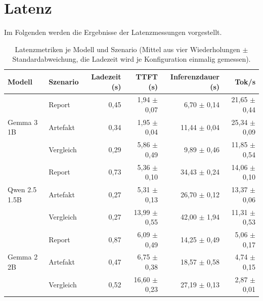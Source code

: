 \section{Latenz}
\label{sec:eval-latenz}
Im Folgenden werden die Ergebnisse der Latenzmessungen vorgestellt.
\setlength{\tabcolsep}{4pt}
\begin{table}[H]
    \centering
    \caption{Latenzmetriken je Modell und Szenario (Mittel aus vier Wiederholungen $\pm$ Standardabweichung, die Ladezeit wird je Konfiguration einmalig gemessen).}
    \label{tab:eval-latenz}
    \begin{tabular}{llrrrr}
        \toprule
        \textbf{Modell} & \textbf{Szenario} & \textbf{Ladezeit (s)} & \textbf{TTFT (s)} & \textbf{Inferenzdauer (s)} & \textbf{Tok/s} \\
        \midrule
        \multirow{3}{*}{Gemma 3 1B}
            & Report    & 0,45 & 1,94 $\pm$ 0,07 & 6,70 $\pm$ 0,14  & 21,65 $\pm$ 0,44 \\
            & Artefakt  & 0,34 & 1,95 $\pm$ 0,04 & 11,44 $\pm$ 0,04 & 25,34 $\pm$ 0,09 \\
            & Vergleich & 0,29 & 5,86 $\pm$ 0,49 & 9,89 $\pm$ 0,46  & 11,85 $\pm$ 0,54 \\
        \midrule
        \multirow{3}{*}{Qwen 2.5 1.5B}
            & Report    & 0,73 & 5,36 $\pm$ 0,10 & 34,43 $\pm$ 0,24 & 14,06 $\pm$ 0,10 \\
            & Artefakt  & 0,27 & 5,31 $\pm$ 0,13 & 26,70 $\pm$ 0,12 & 13,37 $\pm$ 0,06 \\
            & Vergleich & 0,27 & 13,99 $\pm$ 0,55 & 42,00 $\pm$ 1,94 & 11,31 $\pm$ 0,53 \\
        \midrule
        \multirow{3}{*}{Gemma 2 2B}
            & Report    & 0,87 & 6,09 $\pm$ 0,49 & 14,25 $\pm$ 0,49 & 5,06 $\pm$ 0,17 \\
            & Artefakt  & 0,47 & 6,75 $\pm$ 0,38 & 18,57 $\pm$ 0,58 & 4,74 $\pm$ 0,15 \\
            & Vergleich & 0,52 & 16,60 $\pm$ 0,23 & 27,19 $\pm$ 0,13 & 2,87 $\pm$ 0,01 \\
        \bottomrule
    \end{tabular}
\end{table}

